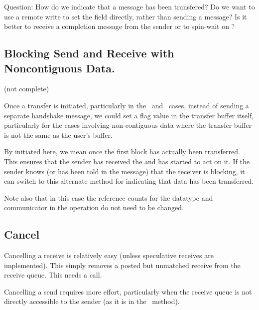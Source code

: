 \begin{via}
  Question: How do we indicate that a message has been transfered?  Do we want
  to use a remote write to set the  field
  directly, rather than sending a message?  Is it better to receive a
  completion message from the sender or to spin-wait on
  ? 

\end{via}

\subsection{Blocking Send and Receive with Noncontiguous Data.}
\label{sec:blocking-optimization}
(not complete)

Once a transfer is initiated, particularly in the \shmemname\ and \vianame\
cases, instead of sending a separate handshake message, we could set a flag
value in the transfer buffer itself, particularly for the cases involving
non-contiguous data where the transfer buffer is not the same as the user's
buffer.  

By initiated here, we mean once the first block has actually been
transferred.  This ensures that the sender has received the
 and has started to act on it.  If the sender
knows (or has been told in the \mpidconst{MPID_Hid_ok_to_send} message) that
the receiver is blocking, it can switch to this alternate method for
indicating that data has been transferred.

Note also that in this case the reference counts for the datatype and
communicator in the operation do not need to be changed.



\subsection{Cancel}
Cancelling a receive is relatively easy (unless speculative receives
are implemented).   This simply removes a posted but unmatched receive
from the receive queue.  This needs a
 call.

Cancelling a send requires more effort, particularly when the receive
queue is not directly accessible to the sender (as it is in the
\shmemname\ method).  

\subsubsection{\tcpname}

